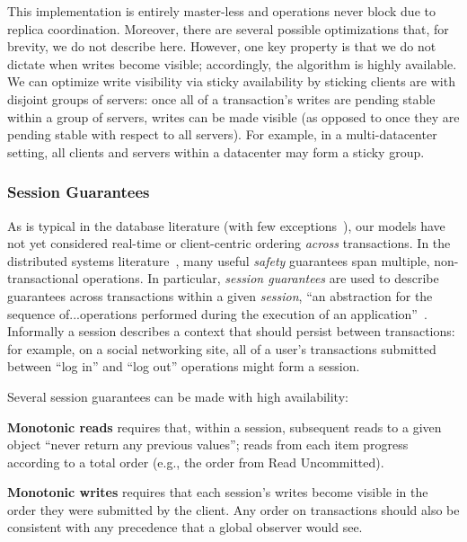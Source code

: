 This implementation is entirely master-less and operations never block
due to replica coordination. Moreover, there are several possible
optimizations that, for brevity, we do not describe here. However, one
key property is that we do not dictate when writes become visible;
accordingly, the algorithm is highly available. We can optimize write
visibility via sticky availability by sticking clients are with
disjoint groups of servers: once all of a transaction's writes are
pending stable within a group of servers, writes can be made visible
(as opposed to once they are pending stable with respect to all
servers). For example, in a multi-datacenter setting, all clients and
servers within a datacenter may form a sticky group.


\subsubsection{Session Guarantees}

As is typical in the database literature (with few
exceptions~\cite{daudjee-session}), our models have not yet considered
real-time or client-centric ordering \textit{across} transactions. In
the distributed systems literature~\cite{sessionguarantees, vogels-defs}, many
useful \textit{safety} guarantees span multiple, non-transactional
operations. In particular, \textit{session guarantees} are used to
describe guarantees across transactions within a given
\textit{session}, ``an abstraction for the sequence of...operations
performed during the execution of an
application''~\cite{sessionguarantees}. Informally a session describes
a context that should persist between transactions: for example, on a
social networking site, all of a user's transactions submitted between
``log in'' and ``log out'' operations might form a session.

Several session guarantees can be made with high availability:

\vspace{.5em}\noindent\textbf{{Monotonic reads}} requires that, within
a session, subsequent reads to a given object ``never return any
previous values''; reads from each item progress according to a total
order (e.g., the order from Read Uncommitted).

\vspace{.5em}\noindent\textbf{{Monotonic writes}} requires that each
session's writes become visible in the order they were submitted by
the client. Any order on transactions should also be consistent with
any precedence that a global observer would see.


